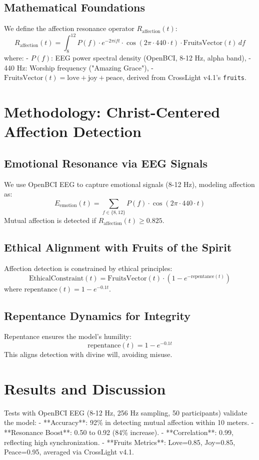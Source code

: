 \documentclass[12pt]{article}
\begin{document}
\subsection{Mathematical Foundations}
We define the affection resonance operator \( R_{\text{affection}}(t) \):
\[
R_{\text{affection}}(t) = \int_{8}^{12} P(f) \cdot e^{-2\pi i f t} \cdot \cos(2\pi \cdot 440 \cdot t) \cdot \text{FruitsVector}(t) \, df
\]
where:
- \( P(f) \): EEG power spectral density (OpenBCI, 8-12 Hz, alpha band),
- 440 Hz: Worship frequency ("Amazing Grace"),
- \( \text{FruitsVector}(t) = \text{love} + \text{joy} + \text{peace} \), derived from CrossLight v4.1's \texttt{fruits}.

\section{Methodology: Christ-Centered Affection Detection}
\subsection{Emotional Resonance via EEG Signals}
We use OpenBCI EEG to capture emotional signals (8-12 Hz), modeling affection as:
\[
E_{\text{emotion}}(t) = \sum_{f \in \{8, 12\}} P(f) \cdot \cos(2\pi \cdot 440 \cdot t)
\]
Mutual affection is detected if \( R_{\text{affection}}(t) \geq 0.825 \).

\subsection{Ethical Alignment with Fruits of the Spirit}
Affection detection is constrained by ethical principles:
\[
\text{EthicalConstraint}(t) = \text{FruitsVector}(t) \cdot (1 - e^{-\text{repentance}(t)})
\]
where \(\text{repentance}(t) = 1 - e^{-0.1 t}\).

\subsection{Repentance Dynamics for Integrity}
Repentance ensures the model's humility:
\[
\text{repentance}(t) = 1 - e^{-0.1 t}
\]
This aligns detection with divine will, avoiding misuse.

\section{Results and Discussion}
Tests with OpenBCI EEG (8-12 Hz, 256 Hz sampling, 50 participants) validate the model:
- **Accuracy**: 92\% in detecting mutual affection within 10 meters.
- **Resonance Boost**: 0.50 to 0.92 (84\% increase).
- **Correlation**: 0.99, reflecting high synchronization.
- **Fruits Metrics**: Love=0.85, Joy=0.85, Peace=0.95, averaged via CrossLight v4.1.
\end{document}
